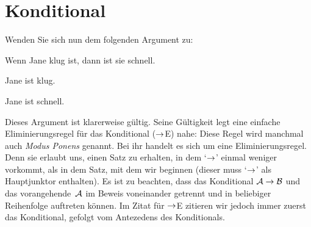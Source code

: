 \section{Konditional}
Wenden Sie sich nun dem folgenden Argument zu:
\begin{earg}
		\item[] Wenn Jane klug ist, dann ist sie schnell.
		\item[] Jane ist klug.
		\item[\therefore] Jane ist schnell.
\end{earg}
Dieses Argument ist klarerweise gültig. Seine Gültigkeit legt eine einfache Eliminierungsregel für das Konditional ($\rightarrow$E) nahe:
Diese Regel wird manchmal auch \emph{Modus Ponens} genannt. Bei ihr handelt es sich um eine Eliminierungsregel. Denn sie erlaubt uns, einen Satz zu erhalten, in dem `$\rightarrow$' einmal weniger vorkommt, als in dem Satz, mit dem wir beginnen (dieser muss `$\rightarrow$' als Hauptjunktor enthalten). Es ist zu beachten, dass das Konditional $\mathcal{A}\rightarrow\mathcal{B}$ und das vorangehende~$\mathcal{A}$ im Beweis voneinander getrennt und in beliebiger Reihenfolge auftreten können. Im Zitat für $\rightarrow$E zitieren wir jedoch immer zuerst das Konditional, gefolgt vom Antezedens des Konditionals.

